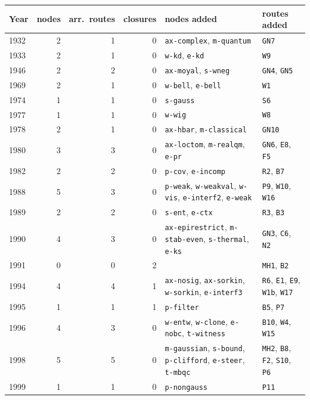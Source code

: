 \begin{longtable}{@{}lrrrp{3.4cm}p{5.6cm}@{}}\toprule
Year & nodes & arr.\ routes & closures & nodes added & routes added \\\midrule\endhead
1932 & 2 & 1 & 0 & \texttt{ax-complex}, \texttt{m-quantum} & \texttt{GN7} \\
1933 & 2 & 1 & 0 & \texttt{w-kd}, \texttt{e-kd} & \texttt{W9} \\
1946 & 2 & 2 & 0 & \texttt{ax-moyal}, \texttt{s-wneg} & \texttt{GN4}, \texttt{GN5} \\
1969 & 2 & 1 & 0 & \texttt{w-bell}, \texttt{e-bell} & \texttt{W1} \\
1974 & 1 & 1 & 0 & \texttt{s-gauss} & \texttt{S6} \\
1977 & 1 & 1 & 0 & \texttt{w-wig} & \texttt{W8} \\
1978 & 2 & 1 & 0 & \texttt{ax-hbar}, \texttt{m-classical} & \texttt{GN10} \\
1980 & 3 & 3 & 0 & \texttt{ax-loctom}, \texttt{m-realqm}, \texttt{e-pr} & \texttt{GN6}, \texttt{E8}, \texttt{F5} \\
1982 & 2 & 2 & 0 & \texttt{p-cov}, \texttt{e-incomp} & \texttt{R2}, \texttt{B7} \\
1988 & 5 & 3 & 0 & \texttt{p-weak}, \texttt{w-weakval}, \texttt{w-vis}, \texttt{e-interf2}, \texttt{e-weak} & \texttt{P9}, \texttt{W10}, \texttt{W16} \\
1989 & 2 & 2 & 0 & \texttt{s-ent}, \texttt{e-ctx} & \texttt{R3}, \texttt{B3} \\
1990 & 4 & 3 & 0 & \texttt{ax-epirestrict}, \texttt{m-stab-even}, \texttt{s-thermal}, \texttt{e-ks} & \texttt{GN3}, \texttt{C6}, \texttt{N2} \\
1991 & 0 & 0 & 2 &  & \texttt{MH1}, \texttt{B2} \\
1994 & 4 & 4 & 1 & \texttt{ax-nosig}, \texttt{ax-sorkin}, \texttt{w-sorkin}, \texttt{e-interf3} & \texttt{R6}, \texttt{E1}, \texttt{E9}, \texttt{W1b}, \texttt{W17} \\
1995 & 1 & 1 & 1 & \texttt{p-filter} & \texttt{B5}, \texttt{P7} \\
1996 & 4 & 3 & 0 & \texttt{w-entw}, \texttt{w-clone}, \texttt{e-nobc}, \texttt{t-witness} & \texttt{B10}, \texttt{W4}, \texttt{W15} \\
1998 & 5 & 5 & 0 & \texttt{m-gaussian}, \texttt{s-bound}, \texttt{p-clifford}, \texttt{e-steer}, \texttt{t-mbqc} & \texttt{MH2}, \texttt{B8}, \texttt{F2}, \texttt{S10}, \texttt{P6} \\
1999 & 1 & 1 & 0 & \texttt{p-nongauss} & \texttt{P11} \\

\end{longtable}
